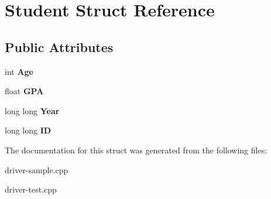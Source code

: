 \hypertarget{structStudent}{\section{Student Struct Reference}
\label{structStudent}
}
\subsection*{Public Attributes}
\begin{DoxyCompactItemize}
\item 
\hypertarget{structStudent_aa66e53d1ab0b51028890cb19ff33fb81}{int {\bfseries Age}}\label{structStudent_aa66e53d1ab0b51028890cb19ff33fb81}

\item 
\hypertarget{structStudent_a0c3ec68d2b20924a3a9ebcbd4cc63d76}{float {\bfseries G\-P\-A}}\label{structStudent_a0c3ec68d2b20924a3a9ebcbd4cc63d76}

\item 
\hypertarget{structStudent_af360e0fd0082d7ca0b87a32c90696ede}{long long {\bfseries Year}}\label{structStudent_af360e0fd0082d7ca0b87a32c90696ede}

\item 
\hypertarget{structStudent_a7919be06b3113baed0ce84dd540a82f9}{long long {\bfseries I\-D}}\label{structStudent_a7919be06b3113baed0ce84dd540a82f9}

\end{DoxyCompactItemize}


The documentation for this struct was generated from the following files\-:\begin{DoxyCompactItemize}
\item 
driver-\/sample.\-cpp\item 
driver-\/test.\-cpp\end{DoxyCompactItemize}
